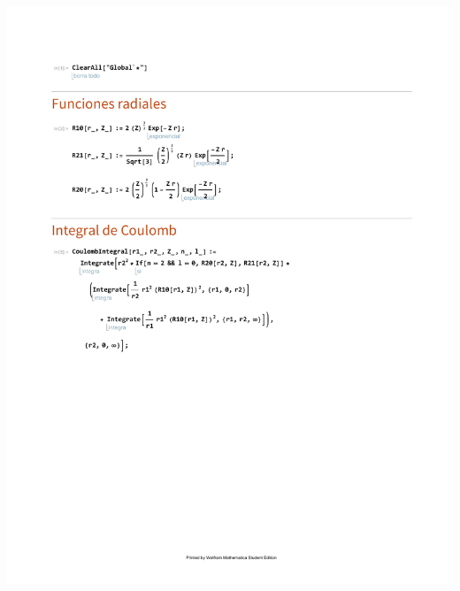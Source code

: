 \documentclass[./../main.tex]{subfiles}
\begin{document}
\begin{exercise}
\begin{solution}
            
            \hspace*{-0.7cm}\includegraphics[page=4, trim={1.95cm 22cm 0 3cm}, width=\linewidth, clip]{../integrals.pdf}
        \end{solution}
    \end{exercise}
\end{document}
